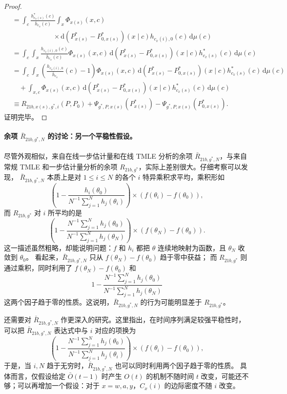 \begin{proof}
\[\begin{aligned}
&=\int_c\frac{h^*_{c_x(s)}(c)}{\bar h_{c_x}(c)}
 \int_x\Phi_{x(s)}(x,c)\\
&\hspace{6em}\times\mathrm d(P^*_{x(s)}-P^*_{0,x(s)})(x\mid c)
 h_{c_x(i),0}(c)\,\mathrm d\mu(c)\\
&=\int_c\int_x\frac{h_{c_x(i),0}(c)}{\bar h_{c_x}(c)}
 \Phi_{x(s)}(x,c)\,\mathrm d(P^*_{x(s)}-P^*_{0,x(s)})(x\mid c)
 h^*_{c_x(s)}(c)\,\mathrm d\mu(c)\\
&=\int_c\int_x\left(\frac{h_{c_x(i),0}}{\bar h_{c_x}}(c)-1\right)
 \Phi_{x(s)}(x,c)\,\mathrm d(P^*_{x(s)}-P^*_{0,x(s)})(x\mid c)
 h^*_{c_x(s)}(c)\,\mathrm d\mu(c)\\
&\quad+\int_{x,c}\Phi_{x(s)}(x,c)
 \,\mathrm d(P^*_{x(s)}-P^*_{0,x(s)})(x\mid c)
 h^*_{c_x(s)}(c)\,\mathrm d\mu(c)\\
&\equiv R_{21b,x(s),g^*,i}(P,P_0)
 +\Psi_{g^*,P,x(s)}(P^*_{x(s)})
 -\Psi_{g^*,P,x(s)}(P^*_{0,x(s)}).
\end{aligned}
\]
证明完毕。
\end{proof}

\paragraph{余项 $\bar R_{21b,g^*,N}$ 的讨论：另一个平稳性假设。}
尽管外观相似，来自在线一步估计量和在线 TMLE 分析的余项
$\bar R_{21b,g^*,N}$，与来自常规 TMLE 和一步估计量分析的余项
$R_{21b,g^*}$，实际上差别很大。仔细考察可以发现，
$\bar R_{21b,g^*,N}$ 本质上是对 $1\le i\le N$ 的各个 $i$ 特异乘积求平均，乘积形如
\[
\left(1-\frac{h_i(\theta_0)}{N^{-1}\sum_{j=1}^Nh_j(\theta_i)}\right)
 \times(f(\theta_i)-f(\theta_0)),
\]
而 $R_{21b,g^*}$ 对 $i$ 所平均的是
\[
\left(1-\frac{N^{-1}\sum_{j=1}^Nh_j(\theta_0)}
 {N^{-1}\sum_{j=1}^Nh_j(\theta_N)}\right)
 \times(f(\theta_N)-f(\theta_0)).
\]
这一描述虽然粗略，却能说明问题：$f$ 和 $h_i$ 都把 $\theta$ 连续地映射为函数，且 $\theta_N$ 收敛到 $\theta_0$。
看起来，$\bar R_{21b,g^*,N}$ 只从 $f(\theta_N)-f(\theta_0)$ 趋于零中获益；
而 $R_{21b,g^*}$ 则通过乘积，同时利用了 $f(\theta_N)-f(\theta_0)$ 和
\[
1-\frac{N^{-1}\sum_{j=1}^Nh_j(\theta_0)}{N^{-1}\sum_{j=1}^Nh_j(\theta_N)}
\]
这两个因子趋于零的性质。这说明，$\bar R_{21b,g^*,N}$ 的行为可能明显差于 $R_{21b,g^*}$。

还需要对 $\bar R_{21b,g^*,N}$ 作更深入的研究。这里指出，在时间序列满足较强平稳性时，可以把 $\bar R_{21b,g^*,N}$ 表达式中与 $i$ 对应的项换为
\[
\left(1-\frac{N^{-1}\sum_{j=1}^Nh_j(\theta_0)}
 {N^{-1}\sum_{j=1}^Nh_j(\theta_i)}\right)
 \times(f(\theta_i)-f(\theta_0)),
\]
于是，当 $i,N$ 趋于无穷时，$\bar R_{21b,g^*,N}$ 也可以同时利用两个因子趋于零的性质。
具体而言，仅假设给定 $\bar O(t-1)$ 时产生 $O(t)$ 的机制不随时间 $t$ 改变，可能还不够；可以再增加一个假设：对于 $x=w,a,y$，$C_x(i)$ 的边际密度不随 $i$ 改变。


